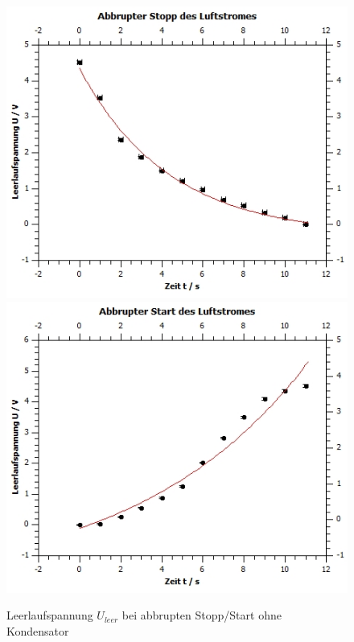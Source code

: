 \documentclass[12pt,a4paper,twoside]{article}
\begin{document}
\begin{figure}[H]
    \centering
    \includegraphics[width=0.6\linewidth]{nudes/wind stopp.jpg}
    \includegraphics[width=0.6\linewidth]{nudes/wind start.jpg}
    \caption{Leerlaufspannung $U_{leer}$ bei abbrupten Stopp/Start ohne Kondensator}
    \label{fig:zusammenfassung Windkraft stopp start ohne}
\end{figure}
\end{document}
